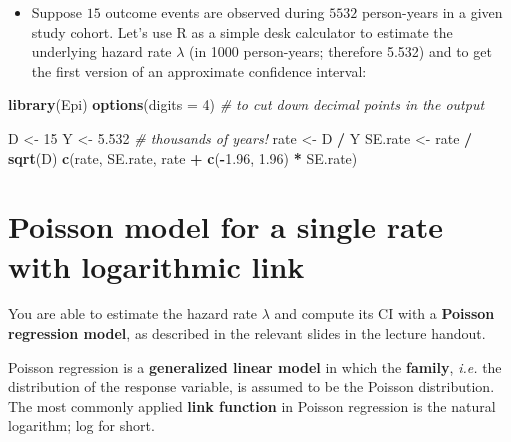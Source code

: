 \documentclass[
]{book}
\newenvironment{Shaded}{\begin{snugshade}}{\end{snugshade}}
\newcommand{\AttributeTok}[1]{\textcolor[rgb]{0.13,0.29,0.53}{#1}}
\newcommand{\CommentTok}[1]{\textcolor[rgb]{0.56,0.35,0.01}{\textit{#1}}}
\newcommand{\DecValTok}[1]{\textcolor[rgb]{0.00,0.00,0.81}{#1}}
\newcommand{\FloatTok}[1]{\textcolor[rgb]{0.00,0.00,0.81}{#1}}
\newcommand{\FunctionTok}[1]{\textcolor[rgb]{0.13,0.29,0.53}{\textbf{#1}}}
\newcommand{\NormalTok}[1]{#1}
\newcommand{\OtherTok}[1]{\textcolor[rgb]{0.56,0.35,0.01}{#1}}
\newcommand{\SpecialCharTok}[1]{\textcolor[rgb]{0.81,0.36,0.00}{\textbf{#1}}}
\providecommand{\tightlist}{%
  \setlength{\itemsep}{0pt}\setlength{\parskip}{0pt}}
\begin{document}
\begin{itemize}
\tightlist
\item
  Suppose \(15\) outcome events are observed during \(5532\) person-years in a given study cohort.
  Let's use R as a simple desk calculator to estimate the underlying hazard rate \(\lambda\) (in 1000
  person-years; therefore 5.532) and to get the first version of an approximate confidence
  interval:
\end{itemize}

\begin{Shaded}
\begin{Highlighting}[]
\FunctionTok{library}\NormalTok{(Epi)}
\FunctionTok{options}\NormalTok{(}\AttributeTok{digits =} \DecValTok{4}\NormalTok{) }\CommentTok{\#  to cut down decimal points in the output}
\end{Highlighting}
\end{Shaded}

\begin{Shaded}
\begin{Highlighting}[]
\NormalTok{D }\OtherTok{\textless{}{-}} \DecValTok{15}
\NormalTok{Y }\OtherTok{\textless{}{-}} \FloatTok{5.532} \CommentTok{\# thousands of years!}
\NormalTok{rate }\OtherTok{\textless{}{-}}\NormalTok{ D }\SpecialCharTok{/}\NormalTok{ Y}
\NormalTok{SE.rate }\OtherTok{\textless{}{-}}\NormalTok{ rate }\SpecialCharTok{/} \FunctionTok{sqrt}\NormalTok{(D)}
\FunctionTok{c}\NormalTok{(rate, SE.rate, rate }\SpecialCharTok{+} \FunctionTok{c}\NormalTok{(}\SpecialCharTok{{-}}\FloatTok{1.96}\NormalTok{, }\FloatTok{1.96}\NormalTok{) }\SpecialCharTok{*}\NormalTok{ SE.rate)}
\end{Highlighting}
\end{Shaded}

\section{Poisson model for a single rate with logarithmic link}\label{poisson-model-for-a-single-rate-with-logarithmic-link}

You are able to estimate the hazard rate \(\lambda\) and compute its CI with a \textbf{Poisson regression model}, as described in the relevant slides in the lecture handout.

Poisson regression is a \textbf{generalized linear model} in which the \textbf{family}, \emph{i.e.} the distribution of the response variable, is assumed to be the Poisson distribution. The most commonly applied \textbf{link function}
in Poisson regression is the natural logarithm; log for short.
\end{document}
